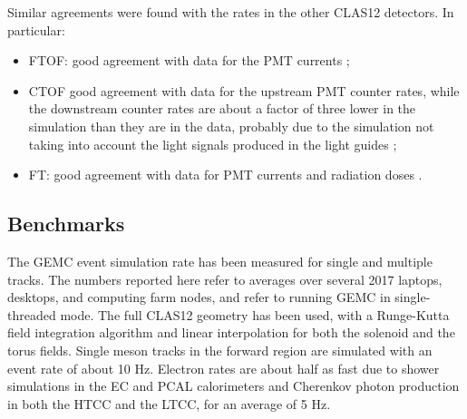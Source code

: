 


Similar agreements were found with the rates in the other CLAS12 detectors. In particular:

\begin{itemize}
	\item FTOF: good agreement with data for the PMT currents \cite{ftof-nim};
	\item CTOF good agreement with data for the upstream PMT counter rates, while the downstream counter rates
		  are about a factor of three lower in the simulation than they are in the data, probably due to the simulation
          not taking into account the light signals produced in the light guides \cite{ctof-nim};
	\item FT: good agreement with data for PMT currents and radiation doses \cite{ft-nim}.
\end{itemize}


\subsection{Benchmarks}

The GEMC event simulation rate has been measured for single and multiple tracks. The numbers reported here
refer to averages over several 2017 laptops, desktops, and computing farm nodes, and refer to running GEMC in single-threaded mode.
The full CLAS12 geometry has been used, with a Runge-Kutta field integration algorithm
and linear interpolation for both the solenoid and the torus fields.
Single meson tracks in the forward region are simulated with an event rate of about 10 Hz.
Electron rates are about half as fast due to shower simulations in the EC and PCAL calorimeters and
Cherenkov photon production in both the HTCC and the LTCC, for an average of 5 Hz.

